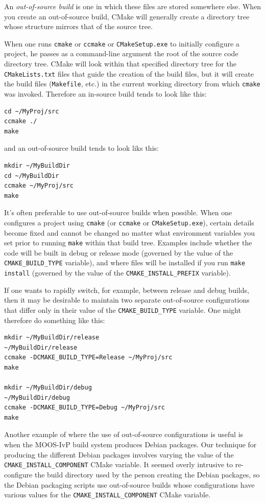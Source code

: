 \documentclass[letterpaper,10pt]{article}
\begin{document}
An \textit{out-of-source build} is one in which these files are stored somewhere
else.  When you create an out-of-source build, CMake will generally create a
directory tree whose structure mirrors that of the source tree.

When one runs \verb|cmake| or \verb|ccmake| or \verb|CMakeSetup.exe| to initially
configure a project, he passes as a command-line argument the root of the source 
code directory tree.  CMake will look within that specified directory tree for
the \verb|CMakeLists.txt| files that guide the creation of the build files, but
it will create the build files (\verb|Makefile|, etc.) in the current working 
directory from which \verb|cmake| was invoked.  Therefore an in-source build
tends to look like this:
\begin{verbatim}
cd ~/MyProj/src
ccmake ./
make
\end{verbatim} 

and an out-of-source build tends to look liks this:
\begin{verbatim}
mkdir ~/MyBuildDir
cd ~/MyBuildDir
ccmake ~/MyProj/src
make
\end{verbatim} 


It's often preferable to use out-of-source builds when possible.  When one
configures a project using \verb|cmake| (or \verb|ccmake| or 
\verb|CMakeSetup.exe|), certain details become fixed and cannot be changed
no matter what environment variables you set prior to running \verb|make|
within that build tree.  Examples include whether the code will be built
in debug or release mode (governed by the value of the \verb|CMAKE_BUILD_TYPE|
variable), and where files will be installed if you run \verb|make install|
(governed by the value of the \verb|CMAKE_INSTALL_PREFIX| variable).  

If one wants to rapidly switch, for example, between release and debug builds,
then it may be desirable to maintain two separate out-of-source configurations
that differ only in their value of the \verb|CMAKE_BUILD_TYPE| variable.  One
might therefore do something like this:

\begin{verbatim}
mkdir ~/MyBuildDir/release
~/MyBuildDir/release
ccmake -DCMAKE_BUILD_TYPE=Release ~/MyProj/src
make

mkdir ~/MyBuildDir/debug
~/MyBuildDir/debug
ccmake -DCMAKE_BUILD_TYPE=Debug ~/MyProj/src
make
\end{verbatim} 


Another example of where the use of out-of-source configurations is useful 
is when the MOOS-IvP build system produces Debian packages.  Our technique
for producing the different Debian packages involves varying the value of
the \verb|CMAKE_INSTALL_COMPONENT| CMake variable.  It seemed overly intrusive
to re-configure the build directory used by the person creating the Debian
packages, so the Debian packaging scripts use out-of-source builds whose
configurations have various values for the \verb|CMAKE_INSTALL_COMPONENT| 
CMake variable.
\end{document}
